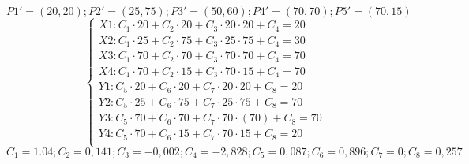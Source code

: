 \[
P1' = (20, 20); P2' = (25, 75);
P3' = (50, 60); P4' = (70, 70);
P5' = (70, 15)
\]
\noindent{}
\[
\begin{cases}
X1: C_1 \cdot 20 + C_2 \cdot 20 + C_3 \cdot 20 \cdot 20 + C_4 = 20 \\
X2: C_1 \cdot 25 + C_2 \cdot 75 + C_3 \cdot 25 \cdot 75 + C_4 = 30 \\
X3: C_1 \cdot 70 + C_2 \cdot 70 + C_3 \cdot 70 \cdot 70 + C_4 = 70 \\
X4: C_1 \cdot 70 + C_2 \cdot 15 + C_3 \cdot 70 \cdot 15 + C_4 = 70 \\
Y1: C_5 \cdot 20 + C_6 \cdot 20 + C_7 \cdot 20 \cdot 20 + C_8 = 20 \\
Y2: C_5 \cdot 25 + C_6 \cdot 75 + C_7 \cdot 25 \cdot 75 + C_8 = 70 \\
Y3: C_5 \cdot 70 + C_6 \cdot 70 + C_7 \cdot 70 \cdot (70) + C_8 = 70 \\
Y4: C_5 \cdot 70 + C_6 \cdot 15 + C_7 \cdot 70 \cdot 15 + C_8 = 20 \\
\end{cases}
\]
\noindent{}
\[
C_1 = 1.04; C_2 = 0,141; C_3 = -0,002; C_4 = -2,828;
C_5 = 0,087; C_6 = 0,896; C_7 = 0; C_8 = 0,257
\]
\vspace{1cm}



